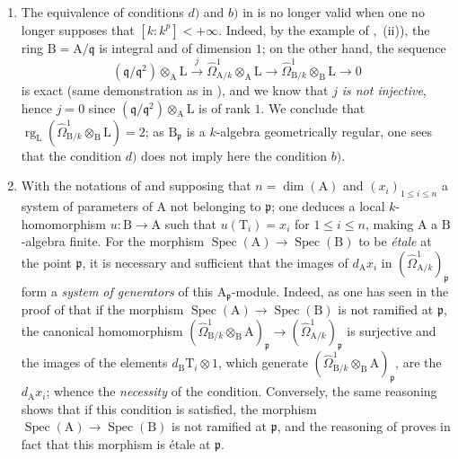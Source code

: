\begin{remark}[18.11.11]
\label{IV.18.11.11}
\begin{enumerate}[label=(\roman*)]
  \item The equivalence of conditions $d)$ and $b)$ in  is no longer valid when one no longer supposes that $[k:k^p]<+\infty$.
Indeed, by the example of ,~(ii)), the ring $\mathrm{B}=\mathrm{A}/\mathfrak{q}$ is integral and of dimension $1$; on the other hand, the sequence
\[
  (\mathfrak{q}/\mathfrak{q}^2)\otimes_{\mathrm{A}}\mathrm{L}\xrightarrow{j}\hat{\Omega}^1_{\mathrm{A}/k}\otimes_{\mathrm{A}}\mathrm{L}\to\hat{\Omega}^1_{\mathrm{B}/k}\otimes_{\mathrm{B}}\mathrm{L}\to 0
\]
is exact (same demonstration as in ), and we know that $j$ \emph{is not injective}, hence $j=0$ since $(\mathfrak{q}/\mathfrak{q}^2)\otimes_\mathrm{A}\mathrm{L}$ is of rank $1$.
We conclude that $\operatorname{rg}_{\mathrm{L}}(\hat{\Omega}^1_{\mathrm{B}/k}\otimes_{\mathrm{B}}\mathrm{L})=2$; as $\mathrm{B}_\mathfrak{p}$ is a $k$-algebra geometrically regular, one sees that the condition $d)$ does not imply here the condition $b)$.
  \item With the notations of  and supposing that $n=\dim(\mathrm{A})$ and $(x_i)_{1\leq i\leq n}$ a system of parameters of $\mathrm{A}$ not belonging to $\mathfrak{p}$; one deduces a local $k$-homomorphism $u:\mathrm{B}\to\mathrm{A}$ such that $u(\mathrm{T}_i)=x_i$ for $1\leq i\leq n$, making $\mathrm{A}$ a $\mathrm{B}$-algebra finite.
For the morphism $\operatorname{Spec}(\mathrm{A})\to\operatorname{Spec}(\mathrm{B})$ to be \emph{\'etale} at the point $\mathfrak{p}$, it is necessary and sufficient that the images of $d_\mathrm{A}x_i$ in $(\hat{\Omega}^1_{\mathrm{A}/k})_\mathfrak{p}$ form a \emph{system of generators} of this $\mathrm{A}_\mathfrak{p}$-module.
Indeed, as one has seen in the proof of  that if the morphism $\operatorname{Spec}(\mathrm{A})\to\operatorname{Spec}(\mathrm{B})$ is not ramified at $\mathfrak{p}$, the canonical homomorphism $(\hat{\Omega}^1_{\mathrm{B}/k}\otimes_\mathrm{B}\mathrm{A})_\mathfrak{p}\to(\hat{\Omega}^1_{\mathrm{A}/k})_\mathfrak{p}$ is surjective and the images of the elements $d_\mathrm{B}\mathrm{T}_i\otimes 1$, which generate $(\hat{\Omega}^1_{\mathrm{B}/k}\otimes_\mathrm{B}\mathrm{A})_\mathfrak{p}$, are the $d_\mathrm{A}x_i$; whence the \emph{necessity} of the condition.
Conversely, the same reasoning shows that if this condition is satisfied, the morphism $\operatorname{Spec}(\mathrm{A})\to\operatorname{Spec}(\mathrm{B})$ is not ramified at $\mathfrak{p}$, and the reasoning of  proves in fact that this morphism is \'etale at $\mathfrak{p}$.
\end{enumerate}
\end{remark}

